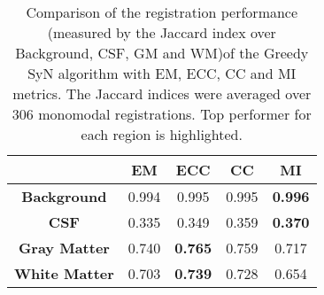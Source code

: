 \begin{table}[htbp]
  \centering
  {\small
    \begin{tabular}{ccccc}
    \toprule
    \textbf{} & \textbf{EM} & \textbf{ECC} & \textbf{CC} & \multicolumn{1}{c}{\textbf{MI}} \\
    \midrule
    \textbf{Background} & 0.994 & 0.995 & 0.995 & \textbf{0.996} \\
    \textbf{CSF} & 0.335 & 0.349 & 0.359 & \textbf{0.370} \\
    \textbf{Gray Matter} & 0.740 & \textbf{0.765} & 0.759 & 0.717 \\
    \textbf{White Matter} & 0.703 & \textbf{0.739} & 0.728 & 0.654 \\
    \bottomrule
    \end{tabular}%
    \caption{Comparison of the registration performance (measured by the Jaccard index over Background, CSF, GM and WM)of the Greedy SyN algorithm with EM, ECC, CC and MI metrics.
The Jaccard indices were averaged over 306 monomodal registrations. Top performer for each region is highlighted.}
  \label{tab:monomodal_results_segTri_fill}}%
\end{table}%
